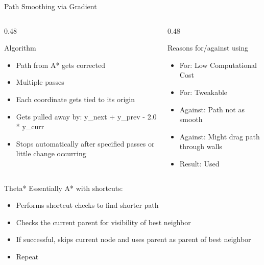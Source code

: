 \documentclass[aspectratio=169, 11pt]{beamer}
\begin{document}
\begin{frame}{Path Smoothing via Gradient}
  \begin{columns}[T]
    \begin{column}{0.48\textwidth}
      \begin{block}{Algorithm}
        \small
        \begin{itemize}
          \item Path from A* gets corrected
          \item Multiple passes
          \item Each coordinate gets tied to its origin
          \item Gets pulled away by: y\_next + y\_prev - 2.0 * y\_curr
          \item Stops automatically after specified passes or little change occurring
        \end{itemize}
      \end{block}
    \end{column}
    
    \begin{column}{0.48\textwidth}
      \begin{block}{Reasons for/against using}
      \small
        \begin{itemize}
          \item \textcolor{green!70!black}{For:} Low Computational Cost
          \item \textcolor{green!70!black}{For:} Tweakable
          \item \textcolor{red!90!black}{Against:} Path not as smooth
          \item \textcolor{red!90!black}{Against:} Might drag path through walls
          \item Result: Used
        \end{itemize}
      \end{block}
    \end{column}
  \end{columns}
\end{frame}


\begin{frame}{Theta*}
  \large
  Essentially A* with shortcuts:
  \begin{itemize}
    \item Performs shortcut checks to find shorter path
    \item Checks the current parent for visibility of best neighbor
    \item If successful, skips current node and uses parent as parent of best neighbor
    \item Repeat
  \end{itemize}
\end{frame}
\end{document}
